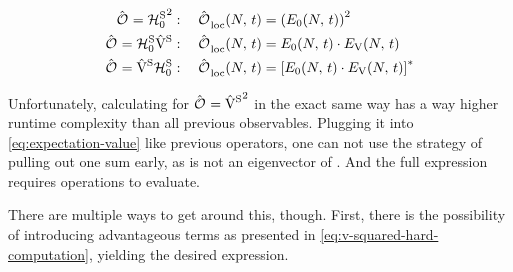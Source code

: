 \begin{equation}
    \label{eq:simple-variance-terms}
    \begin{split}
        \ObservableOp ={\HzeroHamiltonian[\schroedingerPicture]}^2   &: \quad \localObservable{N}{t} =
        \left(E_0(N,\,t)\right)^2
        \\
        \ObservableOp =\HzeroHamiltonian[\schroedingerPicture]\Vhamiltonian[\schroedingerPicture]   &: \quad \localObservable{N}{t} = E_0(N,\,t) \cdot E_\text{V}(N,\,t)
        \\
        \ObservableOp =\Vhamiltonian[\schroedingerPicture]\HzeroHamiltonian[\schroedingerPicture]   &: \quad \localObservable{N}{t} = \left[E_0(N,\,t) \cdot E_\text{V}(N,\,t) \right]^\ast
    \end{split}
\end{equation}

Unfortunately, calculating  for $\ObservableOp = {\Vhamiltonian[\schroedingerPicture]}^2$ in the exact same way has a way higher runtime complexity than all previous observables.
Plugging it into \autoref{eq:expectation-value} like previous operators, one can not use the strategy of pulling out one sum early, as \ketN[N] is not an eigenvector of \Vhamiltonian[\schroedingerPicture].
And the full expression requires  operations to evaluate. 

There are multiple ways to get around this, though. First, there is the possibility of introducing advantageous terms as presented in \autoref{eq:v-squared-hard-computation}, yielding the desired expression.

